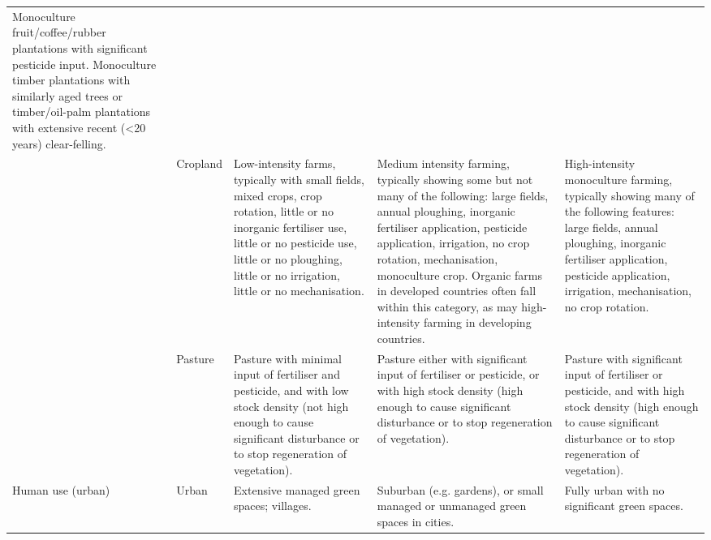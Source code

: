 \documentclass[titlesmallcaps,copyrightpage]{uomthesis}\usepackage[]{graphicx}\usepackage[]{color}
\begin{document}
\begin{landscape}
\begin{table}[htb]
\begin{tabularx}{1.5\textwidth}{YlYYY}
  Monoculture fruit/coffee/rubber plantations with significant pesticide input. Monoculture timber plantations with similarly aged trees or timber/oil-palm plantations with extensive recent (\textless 20 years) clear-felling. \\
 &
  Cropland &
  Low-intensity farms, typically with small fields, mixed crops, crop rotation, little or no inorganic fertiliser use, little or no pesticide use, little or no ploughing, little or no irrigation, little or no mechanisation. &
  Medium intensity farming, typically showing some but not many of the following: large fields, annual ploughing, inorganic fertiliser application, pesticide application, irrigation, no crop rotation, mechanisation, monoculture crop. Organic farms in developed countries often fall within this category, as may high- intensity farming in developing countries. &
  High-intensity monoculture farming, typically showing many of the following features: large fields, annual ploughing, inorganic fertiliser application, pesticide application, irrigation, mechanisation, no crop rotation. \\
 &
  Pasture &
  Pasture with minimal input of fertiliser and pesticide, and with low stock density (not high enough to cause significant disturbance or to stop regeneration of vegetation). &
  Pasture either with significant input of fertiliser or pesticide, or with high stock density (high enough to cause significant disturbance or to stop regeneration of vegetation). &
  Pasture with significant input of fertiliser or pesticide, and with high stock density (high enough to cause significant disturbance or to stop regeneration of vegetation). \\
Human use (urban) &
  Urban &
  Extensive managed green spaces; villages. &
  Suburban (e.g. gardens), or small managed or unmanaged green spaces in cities. &
  Fully urban with no significant green spaces.\\
  \bottomrule
\end{tabularx}
\end{table}
\end{landscape}
\end{document}

